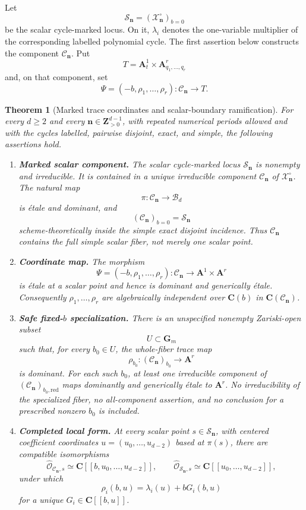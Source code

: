 \documentclass[11pt]{article}
\newtheorem{theorem}{Theorem}[section]
\theoremstyle{definition}
\theoremstyle{remark}
\newcommand{\C}{\mathbf C}
\newcommand{\A}{\mathbf A}
\newcommand{\Gm}{\mathbf G_m}
\newcommand{\Z}{\mathbf Z}
\newcommand{\cB}{\mathcal B}
\newcommand{\cC}{\mathcal C}
\newcommand{\cS}{\mathcal S}
\newcommand{\cX}{\mathcal X}
\newcommand{\bn}{\mathbf n}
\newcommand{\red}{\mathrm{red}}
\begin{document}
Let
\[
  \cS_{\bn}=(\cX_{\bn}^{\circ})_{b=0}
\]
be the scalar cycle-marked locus.  On it, $\lambda_i$ denotes the
one-variable multiplier of the corresponding labelled polynomial cycle.
The first assertion below constructs the component $\cC_{\bn}$.  Put
\[
  T=\A^1_t\times\A^r_{q_1,\ldots,q_r}
\]
and, on that component, set
\[
  \Psi=(-b,\rho_1,\ldots,\rho_r):\cC_{\bn}\longrightarrow T.
\]

\begin{theorem}[Marked trace coordinates and scalar-boundary ramification]
\label{thm:main}
For every $d\geq2$ and every
$\bn\in\Z_{>0}^{d-1}$, with repeated numerical periods allowed and with
the cycles labelled, pairwise disjoint, exact, and simple, the following
assertions hold.
\begin{enumerate}[label=\textup{(\arabic*)},leftmargin=2.4em]
  \item \textbf{Marked scalar component.}
  The scalar cycle-marked locus $\cS_{\bn}$ is nonempty and irreducible.
  It is contained in a unique irreducible component $\cC_{\bn}$ of
  $\cX_{\bn}^{\circ}$.  The natural map
  \[
    \pi:\cC_{\bn}\longrightarrow\cB_d
  \]
  is étale and dominant, and
  \[
    (\cC_{\bn})_{b=0}=\cS_{\bn}
  \]
  scheme-theoretically inside the simple exact disjoint incidence.  Thus
  $\cC_{\bn}$ contains the full simple scalar fiber, not merely one scalar
  point.

  \item \textbf{Coordinate map.}
  The morphism
  \[
    \Psi=(-b,\rho_1,\ldots,\rho_r):
    \cC_{\bn}\longrightarrow\A^1\times\A^r
  \]
  is étale at a scalar point and hence is dominant and generically étale.
  Consequently $\rho_1,\ldots,\rho_r$ are algebraically independent over
  $\C(b)$ in $\C(\cC_{\bn})$.

  \item \textbf{Safe fixed-$b$ specialization.}
  There is an unspecified nonempty Zariski-open subset
  \[
    U\subset\Gm
  \]
  such that, for every $b_0\in U$, the whole-fiber trace map
  \[
    \rho_{b_0}:(\cC_{\bn})_{b_0}\longrightarrow\A^r
  \]
  is dominant.  For each such $b_0$, at least one irreducible component of
  $(\cC_{\bn})_{b_0,\red}$ maps dominantly and generically étale to
  $\A^r$.  No irreducibility of the specialized fiber, no all-component
  assertion, and no conclusion for a prescribed nonzero $b_0$ is included.

  \item \textbf{Completed local form.}
  At every scalar point $s\in\cS_{\bn}$, with centered coefficient
  coordinates $u=(u_0,\ldots,u_{d-2})$ based at $\pi(s)$, there are
  compatible isomorphisms
  \[
    \widehat{\mathcal O}_{\cC_{\bn},s}
    \simeq\C[[b,u_0,\ldots,u_{d-2}]],
    \qquad
    \widehat{\mathcal O}_{\cS_{\bn},s}
    \simeq\C[[u_0,\ldots,u_{d-2}]],
  \]
  under which
  \[
    \rho_i(b,u)=\lambda_i(u)+bG_i(b,u)
  \]
  for a unique $G_i\in\C[[b,u]]$.


\end{enumerate}
\end{theorem}
\end{document}
